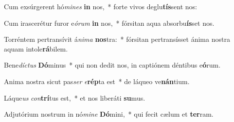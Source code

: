 \item Cum exsúrgerent hó\textit{mi}\textit{nes} \textbf{in} nos,~* forte vivos deglu\textbf{tís}sent nos:
\item Cum irascerétur furor e\textit{ó}\textit{rum} \textbf{in} nos,~* fórsitan aqua absorbu\textbf{ís}set nos.
\item Torréntem pertransívit á\textit{ni}\textit{ma} \textbf{nos}tra:~* fórsitan pertransísset ánima nostra aquam intole\textbf{rá}bilem.
\item Bene\textit{díc}\textit{tus} \textbf{Dó}minus~* qui non dedit nos, in captiónem déntibus e\textbf{ó}rum.
\item Anima nostra sicut pas\textit{ser} \textit{e}\textbf{rép}ta est~* de láqueo ve\textbf{nán}tium.
\item Láque\textit{us} \textit{con}\textbf{trí}tus est,~* et nos liberáti \textbf{su}mus.
\item Adjutórium nostrum in nó\textit{mi}\textit{ne} \textbf{Dó}mini,~* qui fecit cælum et \textbf{ter}ram.
